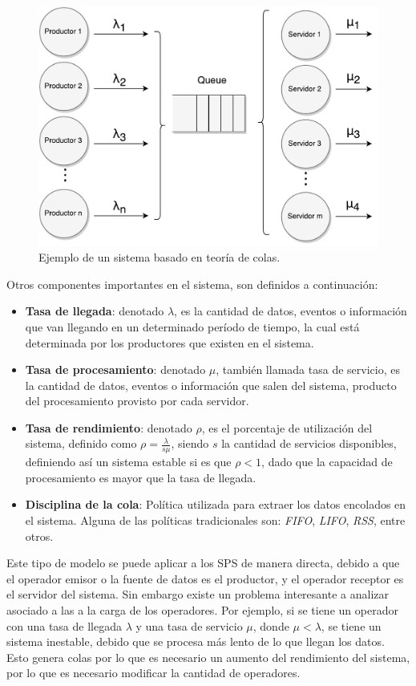 \begin{figure}[!ht]
	\centering
	\includegraphics[scale=0.6]{images/TeoriaColas.pdf}
	\caption{Ejemplo de un sistema basado en teoría de colas.}
	\label{fig:teoriaColas}
\end{figure}

Otros componentes importantes en el sistema, son definidos a continuación:
\begin{itemize}
	\item \textbf{Tasa de llegada}: denotado $\lambda$, es la cantidad de datos, eventos o información que van llegando en un determinado período de tiempo, la cual está determinada por los productores que existen en el sistema.
	\item \textbf{Tasa de procesamiento}: denotado $\mu$, también llamada tasa de servicio, es la cantidad de datos, eventos o información que salen del sistema, producto del procesamiento provisto por cada servidor.
	\item \textbf{Tasa de rendimiento}: denotado $\rho$, es el porcentaje de utilización del sistema, definido como $\rho = \frac{\lambda}{s\mu}$, siendo $s$ la cantidad de servicios disponibles, definiendo así un sistema estable si es que $\rho < 1$, dado que la capacidad de procesamiento es mayor que la tasa de llegada.
	\item \textbf{Disciplina de la cola}: Política utilizada para extraer los datos encolados en el sistema. Alguna de las políticas tradicionales son: \textit{FIFO}, \textit{LIFO}, \textit{RSS}, entre otros.
\end{itemize}

Este tipo de modelo se puede aplicar a los SPS de manera directa, debido a que el operador emisor o la fuente de datos es el productor, y el operador receptor es el servidor del sistema. Sin embargo existe un problema interesante a analizar asociado a las a la carga de los operadores. Por ejemplo, si se tiene un operador con una tasa de llegada $\lambda$ y una tasa de servicio $\mu$, donde $\mu < \lambda$, se tiene un sistema inestable, debido que se procesa más lento de lo que llegan los datos. Esto genera colas por lo que es necesario un aumento del rendimiento del sistema, por lo que es necesario modificar la cantidad de operadores.